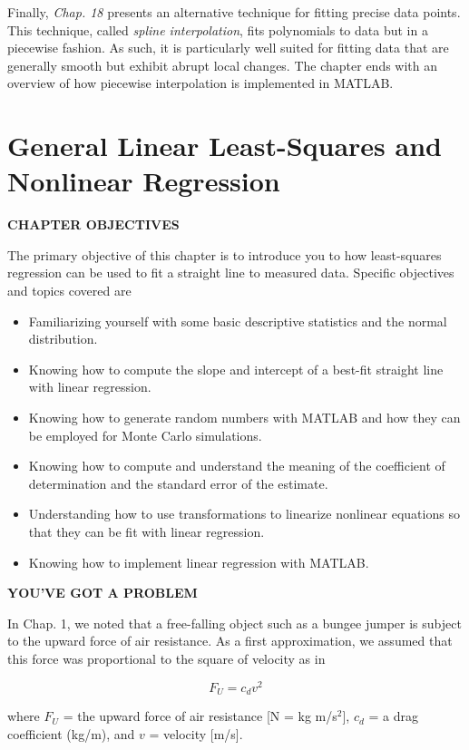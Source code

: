 \documentclass[../main.tex]{subfiles}
\begin{document}
Finally, \textit{Chap. 18} presents an alternative technique for fitting precise data points. This
technique, called \textit{spline interpolation}, fits polynomials to data but in a piecewise fashion.
As such, it is particularly well suited for fitting data that are generally smooth but exhibit
abrupt local changes. The chapter ends with an overview of how piecewise interpolation is
implemented in MATLAB.

\label{cha:cha_P_14} 
\chapter{General Linear Least-Squares and Nonlinear Regression}
\textbf{CHAPTER OBJECTIVES}

\noindent The primary objective of this chapter is to introduce you to how least-squares
regression can be used to fit a straight line to measured data. Specific objectives and
topics covered are

\begin{itemize}
	\item Familiarizing yourself with some basic descriptive statistics and the normal
	distribution.
	\item	 Knowing how to compute the slope and intercept of a best-fit straight line with
	linear regression.
	\item	 Knowing how to generate random numbers with MATLAB and how they can be
	employed for Monte Carlo simulations.
	\item	 Knowing how to compute and understand the meaning of the coefficient of
	determination and the standard error of the estimate.
	\item	 Understanding how to use transformations to linearize nonlinear equations so that
	they can be fit with linear regression.
	\item	 Knowing how to implement linear regression with MATLAB.
\end{itemize}

\noindent\textbf{YOU'VE GOT A PROBLEM}

\noindent In Chap. 1, we noted that a free-falling object such as a bungee jumper is subject to the upward force of air resistance. As a first approximation, we assumed that this force was proportional to the square of velocity as in

\begin{equation}
	\tag{14.1}
	F_U = c_d v^2
\end{equation}

\noindent where $F_U$ = the upward force of air resistance [N = kg m/s$^2$], $c_d$ = a drag coefficient
(kg/m), and $v$ = velocity [m/s].
\end{document}
